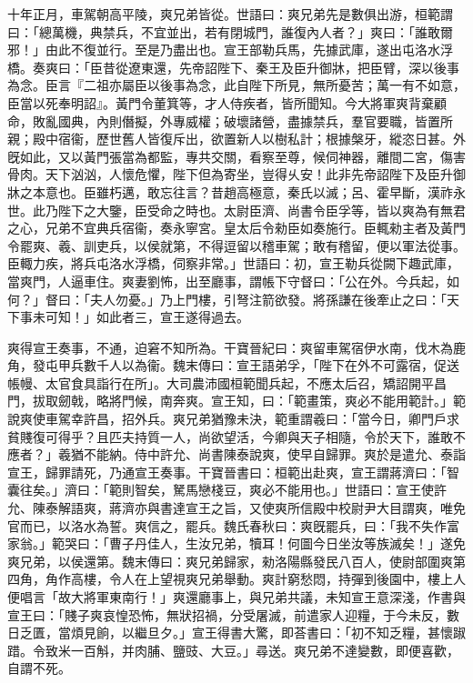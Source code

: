 \begin{pinyinscope}
十年正月，車駕朝高平陵，爽兄弟皆從。世語曰：爽兄弟先是數俱出游，桓範謂曰：「總萬機，典禁兵，不宜並出，若有閉城門，誰復內人者？」爽曰：「誰敢爾邪！」由此不復並行。至是乃盡出也。宣王部勒兵馬，先據武庫，遂出屯洛水浮橋。奏爽曰：「臣昔從遼東還，先帝詔陛下、秦王及臣升御牀，把臣臂，深以後事為念。臣言『二祖亦屬臣以後事為念，此自陛下所見，無所憂苦；萬一有不如意，臣當以死奉明詔』。黃門令董箕等，才人侍疾者，皆所聞知。今大將軍爽背棄顧命，敗亂國典，內則僭擬，外專威權；破壞諸營，盡據禁兵，羣官要職，皆置所親；殿中宿衞，歷世舊人皆復斥出，欲置新人以樹私計；根據槃牙，縱恣日甚。外旣如此，又以黃門張當為都監，專共交關，看察至尊，候伺神器，離間二宮，傷害骨肉。天下汹汹，人懷危懼，陛下但為寄坐，豈得乆安！此非先帝詔陛下及臣升御牀之本意也。臣雖朽邁，敢忘往言？昔趙高極意，秦氏以滅；呂、霍早斷，漢祚永世。此乃陛下之大鑒，臣受命之時也。太尉臣濟、尚書令臣孚等，皆以爽為有無君之心，兄弟不宜典兵宿衞，奏永寧宮。皇太后令勑臣如奏施行。臣輒勑主者及黃門令罷爽、羲、訓吏兵，以侯就第，不得逗留以稽車駕；敢有稽留，便以軍法從事。臣輙力疾，將兵屯洛水浮橋，伺察非常。」世語曰：初，宣王勒兵從闕下趣武庫，當爽門，人逼車住。爽妻劉怖，出至廳事，謂帳下守督曰：「公在外。今兵起，如何？」督曰：「夫人勿憂。」乃上門樓，引弩注箭欲發。將孫謙在後牽止之曰：「天下事未可知！」如此者三，宣王遂得過去。

爽得宣王奏事，不通，迫窘不知所為。干寶晉紀曰：爽留車駕宿伊水南，伐木為鹿角，發屯甲兵數千人以為衞。魏末傳曰：宣王語弟孚，「陛下在外不可露宿，促送帳幔、太官食具詣行在所」。大司農沛國桓範聞兵起，不應太后召，矯詔開平昌門，拔取劒戟，略將門候，南奔爽。宣王知，曰：「範畫策，爽必不能用範計。」範說爽使車駕幸許昌，招外兵。爽兄弟猶豫未決，範重謂羲曰：「當今日，卿門戶求貧賤復可得乎？且匹夫持質一人，尚欲望活，今卿與天子相隨，令於天下，誰敢不應者？」羲猶不能納。侍中許允、尚書陳泰說爽，使早自歸罪。爽於是遣允、泰詣宣王，歸罪請死，乃通宣王奏事。干寶晉書曰：桓範出赴爽，宣王謂蔣濟曰：「智囊往矣。」濟曰：「範則智矣，駑馬戀棧豆，爽必不能用也。」世語曰：宣王使許允、陳泰解語爽，蔣濟亦與書達宣王之旨，又使爽所信殿中校尉尹大目謂爽，唯免官而已，以洛水為誓。爽信之，罷兵。魏氏春秋曰：爽旣罷兵，曰：「我不失作富家翁。」範哭曰：「曹子丹佳人，生汝兄弟，犢耳！何圖今日坐汝等族滅矣！」遂免爽兄弟，以侯還第。魏末傳曰：爽兄弟歸家，勑洛陽縣發民八百人，使尉部圍爽第四角，角作高樓，令人在上望視爽兄弟舉動。爽計窮愁悶，持彈到後園中，樓上人便唱言「故大將軍東南行！」爽還廳事上，與兄弟共議，未知宣王意深淺，作書與宣王曰：「賤子爽哀惶恐怖，無狀招禍，分受屠滅，前遣家人迎糧，于今未反，數日乏匱，當煩見餉，以繼旦夕。」宣王得書大驚，即荅書曰：「初不知乏糧，甚懷踧踖。令致米一百斛，并肉脯、鹽豉、大豆。」尋送。爽兄弟不達變數，即便喜歡，自謂不死。


\end{pinyinscope}
